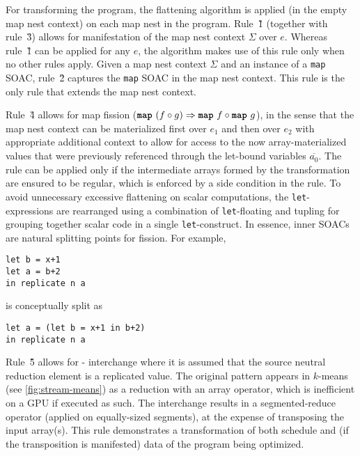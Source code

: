 For transforming the program, the flattening algorithm
is applied (in the empty map nest context) on each map nest in
the program.
%
Rule~\G{1} (together with rule~\G{3}) allows for manifestation of the
map nest context $\Sigma$ over $e$. Whereas rule~\G{1} can be applied
for any $e$, the algorithm makes use of this rule only when no other
rules apply.
%
Given a map nest context $\Sigma$ and an instance of a \texttt{map}
SOAC, rule~\G{2} captures the \texttt{map} SOAC in the
map nest context. This rule is the only rule that extends the map
nest context.


Rule~\G{4} allows for map fission
($\mbox{\texttt{\bfseries{map}}}~(f\circ g) \Rightarrow \mbox{\texttt{\bfseries{map}}}~f\circ \mbox{\texttt{\bfseries{map}}}~g$),
in the sense that the map nest context can be
materialized first over $e_1$ and then over $e_2$ with appropriate
additional context to allow for access to the now array-materialized
values that were previously referenced through the let-bound variables
$\overline{a_0}$. The rule can be applied only if the intermediate
arrays formed by the transformation are ensured to be regular, which is
enforced by a side condition in the rule. To avoid unnecessary
excessive flattening on scalar computations, the \lstinline{let}-expressions
are rearranged using a combination of \lstinline{let}-floating
\cite{PeytonJones:1996:LMB:232627.232630} and tupling for grouping
together scalar code in a single \lstinline{let}-construct.
In essence, inner SOACs are natural splitting points for fission.
For example,
\begin{lstlisting}[aboveskip=-0.6\baselineskip]
let b = x+1
let a = b+2
in replicate n a
\end{lstlisting}
is conceptually split as
\begin{lstlisting}[aboveskip=-0.5\baselineskip]
let a = (let b = x+1 in b+2)
in replicate n a
\end{lstlisting}

Rule~\G{5} allows for - interchange where it is
assumed that the source neutral reduction element is a replicated
value.  The original pattern appears in $k$-means (see
\cref{fig:stream-means}) as a reduction with an array operator, which
is inefficient on a GPU if executed as such. The interchange results
in a segmented-reduce operator (applied on equally-sized segments), at
the expense of transposing the input array(s).  This rule demonstrates
a transformation of both schedule and (if the transposition is
manifested) data of the program being optimized.

